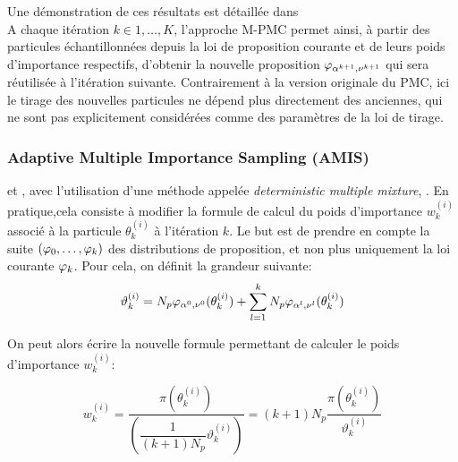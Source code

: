 Une démonstration de ces résultats est détaillée dans  \\


A chaque itération $k \in {1, \dots, K}$, l'approche M-PMC permet ainsi, à partir des particules échantillonnées depuis la loi de proposition courante et de leurs poids d'importance respectifs, d'obtenir la nouvelle proposition ${\varphi}_{\alpha^{k+1}, \nu^{k+1}}$ qui sera réutilisée à l'itération suivante. Contrairement à la version originale du PMC, ici le tirage des nouvelles particules ne dépend plus directement des anciennes, qui ne sont pas explicitement considérées comme des paramètres de la loi de tirage. \\

\subsubsection{Adaptive Multiple Importance Sampling (AMIS)}

 \cite{Veach1995} et \cite{Owen2000}, avec l'utilisation d'une méthode appelée \textit{deterministic multiple mixture}, . En pratique,cela consiste à modifier la formule de calcul du poids d'importance $w_k^{(i)}$ associé à la particule $\theta_k^{(i)}$ à l'itération $k$. Le but est de prendre en compte la suite $({\varphi}_0, \dots, {\varphi}_k)$ des distributions de proposition, et non plus uniquement la loi  courante ${\varphi}_k$. Pour cela, on définit la grandeur suivante:
\begin{equation}
\vartheta_k^{(i)} = N_p {\varphi}_{\alpha^0,\nu^0}(\theta_k^{(i)}) + \sum\limits_{l=1}^k N_p {\varphi}_{\alpha^l,\nu^l}(\theta_k^{(i)})
\label{eq_DMW_1}
\end{equation}

On peut alors écrire la nouvelle formule permettant de calculer le poids d'importance $w_k^{(i)}$:

\begin{equation}
w_k^{(i)} = \dfrac{\pi(\theta_k^{(i)})}{\left(\dfrac{1}{(k+1)N_p}\vartheta_k^{(i)}\right)} = (k+1)N_p\dfrac{\pi(\theta_k^{(i)})}{\vartheta_k^{(i)}}
\end{equation}

